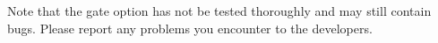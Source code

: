 Note that the gate option has not be tested thoroughly and may still contain
bugs.  Please report any problems you encounter to the developers.



